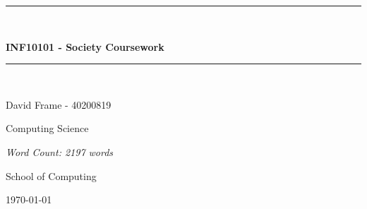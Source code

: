 \documentclass[12pt,a4paper]{article}
\begin{document}
%

\newcommand{\HRule}{\rule{\linewidth}{0.5mm}}

\begin{titlepage}
	\begin{center}

	\HRule \\[0.4cm]
    	{\Large \bfseries INF10101 - Society Coursework\par}
	\vspace{0.2cm}
	\HRule \\[1.5cm]

	
    	\vspace{1cm}
	\begin{minipage}{0.8\textwidth}
	\begin{center} \large
        David Frame - 40200819
        	
				
   	 \end{center}
    	\end{minipage}
	
    	\begin{minipage}{1\textwidth}
    	\begin{center} \large
        
		Computing Science
    	\end{center}
    	\end{minipage}
    	
    \vspace{2cm}
    \begin{minipage}{0.8\textwidth}
	\begin{center} \large
        \emph{Word Count: 2197 words}
        	
				
   	 \end{center}
    	\end{minipage}
	
	

    	\vfill

	\begin{minipage}{1\textwidth}
    	\begin{center} \large
		School of Computing
    	\end{center}
    	\end{minipage}
	
	\vspace{1cm}
    	{\large \today}


	\end{center}
\end{titlepage}
\end{document}
